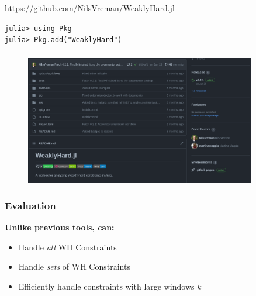 \begin{frame}
    \frametitle{\tool{}}
    \begin{center}
        \Large
        \textcolor{blue}{\url{https://github.com/NilsVreman/WeaklyHard.jl}}
    \end{center}

    \vspace{1cm}
    \texttt{julia> using Pkg}\\
    \texttt{julia> Pkg.add("WeaklyHard")}
\end{frame}

\begin{frame}
    \frametitle{\tool{}}
    \begin{figure}[h]
        \centering
        \includegraphics[width=0.9\textwidth]{figs/rtas22b/git.png}
    \end{figure}
\end{frame}

\begin{frame}
    \frametitle{\tool{} Evaluation}

    \textbf{Unlike previous tools, \tool{} can:} 
    \begin{itemize}\setlength\itemsep{1em}
        \item Handle \emph{all} WH Constraints
        \item Handle \emph{sets} of WH Constraints
        \item Efficiently handle constraints with large windows $k$
    \end{itemize}
\end{frame}
